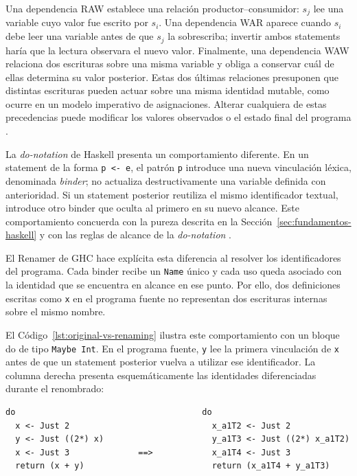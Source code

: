 Una dependencia RAW establece una relación productor--consumidor: $s_j$ lee una variable cuyo valor fue escrito por $s_i$. Una dependencia WAR aparece cuando $s_i$ debe leer una variable antes de que $s_j$ la sobrescriba; invertir ambos statements haría que la lectura observara el nuevo valor. Finalmente, una dependencia WAW relaciona dos escrituras sobre una misma variable y obliga a conservar cuál de ellas determina su valor posterior. Estas dos últimas relaciones presuponen que distintas escrituras pueden actuar sobre una misma identidad mutable, como ocurre en un modelo imperativo de asignaciones. Alterar cualquiera de estas precedencias puede modificar los valores observados o el estado final del programa \cite{DavisKeller1982,HarroldSoffa1994}.

La \textit{do-notation} de \textsf{Haskell} presenta un comportamiento diferente. En un statement de la forma \verb|p <- e|, el patrón \verb|p| introduce una nueva vinculación léxica, denominada \textit{binder}; no actualiza destructivamente una variable definida con anterioridad. Si un statement posterior reutiliza el mismo identificador textual, introduce otro binder que oculta al primero en su nuevo alcance. Este comportamiento concuerda con la pureza descrita en la Sección~\ref{sec:fundamentos-haskell} y con las reglas de alcance de la \textit{do-notation} \cite[sección~3.14]{Haskell2010}.

El Renamer de \textsf{GHC} hace explícita esta diferencia al resolver los identificadores del programa. Cada binder recibe un \texttt{Name} único y cada uso queda asociado con la identidad que se encuentra en alcance en ese punto. Por ello, dos definiciones escritas como \texttt{x} en el programa fuente no representan dos escrituras internas sobre el mismo nombre.

El Código~\ref{lst:original-vs-renaming} ilustra este comportamiento con un bloque \textsf{do} de tipo \texttt{Maybe Int}. En el programa fuente, \texttt{y} lee la primera vinculación de \texttt{x} antes de que un statement posterior vuelva a utilizar ese identificador. La columna derecha presenta esquemáticamente las identidades diferenciadas durante el renombrado:

\noindent\begin{minipage}{\textwidth}
\begin{lstlisting}[style=haskell,caption={Representación esquemática de los binders antes y después del renombrado.},label={lst:original-vs-renaming}]
do                                      do
  x <- Just 2                             x_a1T2 <- Just 2
  y <- Just ((2*) x)                      y_a1T3 <- Just ((2*) x_a1T2)
  x <- Just 3              ==>            x_a1T4 <- Just 3
  return (x + y)                          return (x_a1T4 + y_a1T3)
\end{lstlisting}
\end{minipage}


